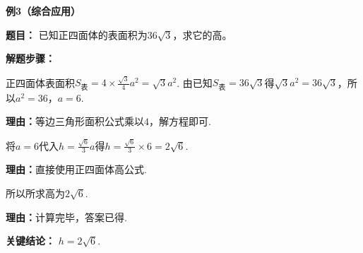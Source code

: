 \begin{examplebox}
	\medskip
	\textbf{\textcolor{CExample}{例3（综合应用）}}

	\textbf{\textcolor{CExample}{题目：}}
	已知正四面体的表面积为$36\sqrt{3}$，求它的高。

	\textbf{\textcolor{CExample}{解题步骤：}}
	\begin{description}[style=nextline, leftmargin=2.8em, labelsep=0.5em, itemsep=0.45em]
		\item[\textbf{第一步（由表面积求棱长）：}]正四面体表面积$S_{\text{表}} = 4 \times \frac{\sqrt{3}}{4} a^2 = \sqrt{3} a^2$. 由已知$S_{\text{表}} = 36\sqrt{3}$得$\sqrt{3} a^2 = 36\sqrt{3}$，所以$a^2 = 36$，$a = 6$.
			\par\textbf{理由：}等边三角形面积公式乘以$4$，解方程即可.
		\item[\textbf{第二步（代高公式）：}]将$a=6$代入$h = \frac{\sqrt{6}}{3} a$得$h = \frac{\sqrt{6}}{3} \times 6 = 2\sqrt{6}$.
			\par\textbf{理由：}直接使用正四面体高公式.
		\item[\textbf{第三步（得结果）：}]所以所求高为$2\sqrt{6}$.
			\par\textbf{理由：}计算完毕，答案已得.
	\end{description}

	\textbf{\textcolor{CExample}{关键结论：}}
	\textbf{$h = 2\sqrt{6}$}.
\end{examplebox}
